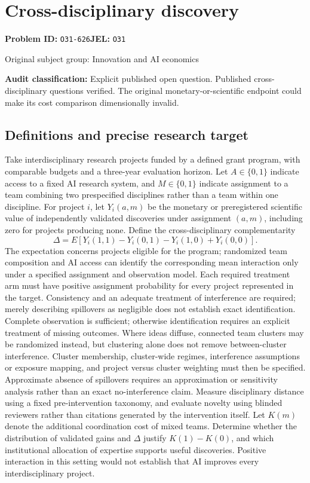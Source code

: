 \documentclass[11pt,a4paper]{article}
\begin{document}
\section*{Cross-disciplinary discovery}
\textbf{Problem ID:} \texttt{O31-626}\quad \textbf{JEL:} \texttt{O31}\par
\label{problem:OP-0411}
{\sffamily\small\color{muted}Original subject group: Innovation and AI economics\par}
\label{definitions:problem:30007693}
\textbf{Audit classification:} Explicit published open question. Published cross-disciplinary questions verified. The original monetary-or-scientific endpoint could make its cost comparison dimensionally invalid.
\subsection*{Definitions and precise research target}
Take interdisciplinary research projects funded by a defined grant program, with comparable budgets and a three-year evaluation horizon. Let \(A\in\{0,1\}\) indicate access to a fixed AI research system, and \(M\in\{0,1\}\) indicate assignment to a team combining two prespecified disciplines rather than a team within one discipline. For project \(i\), let \(Y_i(a,m)\) be the monetary or preregistered scientific value of independently validated discoveries under assignment \((a,m)\), including zero for projects producing none. Define the cross-disciplinary complementarity
\[
\Delta=E[Y_i(1,1)-Y_i(0,1)-Y_i(1,0)+Y_i(0,0)].
\]
The expectation concerns projects eligible for the program; randomized team composition and AI access can identify the corresponding mean interaction only under a specified assignment and observation model. Each required treatment arm must have positive assignment probability for every project represented in the target. Consistency and an adequate treatment of interference are required; merely describing spillovers as negligible does not establish exact identification. Complete observation is sufficient; otherwise identification requires an explicit treatment of missing outcomes. Where ideas diffuse, connected team clusters may be randomized instead, but clustering alone does not remove between-cluster interference. Cluster membership, cluster-wide regimes, interference assumptions or exposure mapping, and project versus cluster weighting must then be specified. Approximate absence of spillovers requires an approximation or sensitivity analysis rather than an exact no-interference claim. Measure disciplinary distance using a fixed pre-intervention taxonomy, and evaluate novelty using blinded reviewers rather than citations generated by the intervention itself. Let \(K(m)\) denote the additional coordination cost of mixed teams. Determine whether the distribution of validated gains and \(\Delta\) justify \(K(1)-K(0)\), and which institutional allocation of expertise supports useful discoveries. Positive interaction in this setting would not establish that AI improves every interdisciplinary project.
\end{document}
